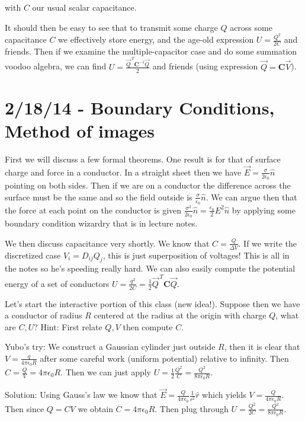 \documentclass[10pt]{report}
\begin{document}
with $C$ our usual scalar capacitance. 

It should then be easy to see that to transmit some charge $Q$ across some capacitance $C$ we effectively store energy, and the age-old expression $U=\frac{Q^2}{2C}$ and friends. Then if we examine the multiple-capacitor case and do some summation voodoo algebra, we can find $U = \frac{\vec{Q}^{\,T}\mathbf{C}^{-1}\vec{Q}}{2}$ and friends (using expression $\vec{Q} = \mathbf{C}\vec{V}$).
\chapter{2/18/14 - Boundary Conditions, Method of images}

First we will discuss a few formal theorems. One result is for that of surface charge and force in a conductor. In a straight sheet then we have $\vec{E} = \frac{\sigma}{2\epsilon_0}\hat{n}$ pointing on both sides. Then if we are on a conductor the difference across the surface must be the same and so the field outside is $\frac{\sigma}{\epsilon_0}\hat{n}$. We can argue then that the force at each point on the conductor is given $\frac{\sigma^2}{2\epsilon_0}\hat{n} = \frac{\epsilon_0}{2}E^2\hat{n}$ by applying some boundary condition wizardry that is in lecture notes.

We then discuss capacitance very shortly. We know that $C = \frac{Q}{\Delta V}$. If we write the discretized case $V_i = D_{ij}Q_j$, this is just superposition of voltages! This is all in the notes so he's speeding really hard. We can also easily compute the potential energy of a set of conductors $U = \frac{q^2}{2C} = \frac{1}{2}\vec{Q}^{\,T}\mathbf{C}\vec{Q}$. 

Let's start the interactive portion of this class (new idea!). Suppose then we have a conductor of radius $R$ centered at the radius at the origin with charge $Q$, what are $C,U$? Hint: First relate $Q,V$ then compute $C$.

Yubo's try: We construct a Gaussian cylinder just outside $R$, then it is clear that $V = \frac{q}{4\pi\epsilon_0 R}$ after some careful work (uniform potential) relative to infinity. Then $C = \frac{Q}{V} = 4\pi\epsilon_0 R$. Then we can just apply $U = \frac{1}{2}\frac{Q^2}{C} = \frac{Q^2}{8\pi\epsilon_0R}$. 

Solution: Using Gauss's law we know that $\vec{E} = \frac{Q}{4\pi\epsilon_0}\frac{1}{r^2}\hat{r}$ which yields $V = \frac{Q}{4\pi\epsilon_0R}$. Then since $Q = CV$ we obtain $C = 4\pi\epsilon_0R$. Then plug through $U = \frac{Q^2}{2C} = \frac{Q^2}{8\pi\epsilon_0R}$. 
\end{document}
